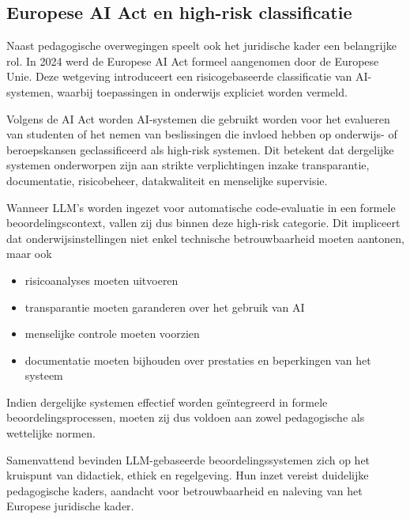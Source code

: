 \subsection{Europese AI Act en high-risk classificatie}

Naast pedagogische overwegingen speelt ook het juridische kader een belangrijke rol. In 2024 werd de Europese AI Act formeel aangenomen door de Europese Unie. Deze wetgeving introduceert een risicogebaseerde classificatie van AI-systemen, waarbij toepassingen in onderwijs expliciet worden vermeld.

\vspace{1em}

Volgens de AI Act worden AI-systemen die gebruikt worden voor het evalueren van studenten of het nemen van beslissingen die invloed hebben op onderwijs- of beroepskansen geclassificeerd als high-risk systemen. Dit betekent dat dergelijke systemen onderworpen zijn aan strikte verplichtingen inzake transparantie, documentatie, risicobeheer, datakwaliteit en menselijke supervisie.

\vspace{1em}

Wanneer LLM’s worden ingezet voor automatische code-evaluatie in een formele beoordelingscontext, vallen zij dus binnen deze high-risk categorie. Dit impliceert dat onderwijsinstellingen niet enkel technische betrouwbaarheid moeten aantonen, maar ook

\begin{itemize}
    \item risicoanalyses moeten uitvoeren
    \item transparantie moeten garanderen over het gebruik van AI
    \item menselijke controle moeten voorzien
    \item documentatie moeten bijhouden over prestaties en beperkingen van het systeem
\end{itemize}

Indien dergelijke systemen effectief worden geïntegreerd in formele beoordelingsprocessen, moeten zij dus voldoen aan zowel pedagogische als wettelijke normen. 

\vspace{1em}

Samenvattend bevinden LLM-gebaseerde beoordelingssystemen zich op het kruispunt van didactiek, ethiek en regelgeving. Hun inzet vereist duidelijke pedagogische kaders, aandacht voor betrouwbaarheid en naleving van het Europese juridische kader.

